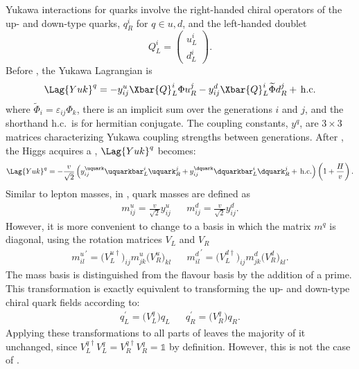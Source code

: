 Yukawa interactions for quarks involve the right-handed chiral operators of the up- and down-type
quarks, $q_R^i$ for $q\in{u,d}$, and the left-handed doublet
\begin{equation}
  Q_L^i = \begin{pmatrix}u^i_L\\d^i_L\end{pmatrix}.
\end{equation}
Before \SSB, the Yukawa Lagrangian is
\begin{equation}
  \Lag{Yuk}^q = - y_{ij}^u\Xbar{Q}_L^i\Phi u_R^j
  - y_{ij}^d\Xbar{Q}_L^i\widetilde\Phi d_R^j +\,\mathrm{h.c.}
  \label{eq:th:lagyukq}
\end{equation}
where $\widetilde\Phi_i = \varepsilon_{ij}\Phi_k$, there is an implicit sum over the generations
$i$ and $j$, and the shorthand h.c.~is for hermitian conjugate.
The coupling constants, $y^{q}$, are $3\times3$ matrices characterizing Yukawa coupling strengths
between generations.
After \SSB, the Higgs acquires a \VEV, $\Lag{Yuk}^q$ becomes:
\begin{equation}
  \Lag{Yuk}^q =
  - \frac{v}{\sqrt{2}}
  \left(
  y_{ij}^\uquark\uquarkbar_L^i\uquark_R^j
  + y_{ij}^\dquark\dquarkbar_L^i\dquark_R^j
  +\,\mathrm{h.c.}
  \right)
  \left(1 + \frac{H}{v}\right).
  \label{eq:th:lagyuk2}
\end{equation}
Similar to lepton masses, in , quark masses are defined as
\begin{align}
  m_{ij}^u = \frac{v}{\sqrt{2}}y_{ij}^u &&
  m_{ij}^d = \frac{v}{\sqrt{2}}y_{ij}^d.
\end{align}
However, it is more convenient to change to a basis in which the matrix $m^q$
is diagonal, using the rotation matrices $V_L$ and $V_R$
\begin{align}
  {m_{il}^{u}}^\prime =  \big(V_L^{u\dagger}\big)_{ij} m_{jk}^u\big(V_R^u\big)_{kl} &&
  {m_{il}^{d}}^\prime =  \big(V_L^{d\dagger}\big)_{ij} m_{jk}^d\big(V_R^d\big)_{kl}.
\end{align}
The mass basis is distinguished from the flavour basis by the addition of a prime.
This transformation is exactly equivalent to transforming the up- and
down-type chiral quark fields according to:
\begin{align}
  q_L^\prime = \big(V_L^q\big)q_{L}^{} &&
  q_R^\prime = \big(V_R^q\big)q_{R}^{}.
\end{align}
Applying these transformations to all parts of  leaves the majority of it unchanged, since
$V_{L}^{q\dagger} V_{L}^{q} = V_{R}^{q\dagger} V_{R}^{q} = \mathds{1}$ by definition.
However, this is not the case of .

